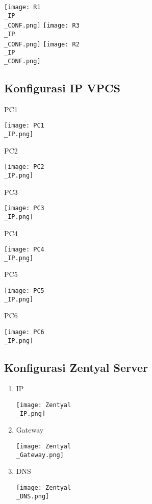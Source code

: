\documentclass[12pt, a4paper]{article}
\begin{document}
  \begin{center}
      \texttt{[image: R1\\\_IP\\\_CONF.png]}
      \texttt{[image: R3\\\_IP\\\_CONF.png]}
      \texttt{[image: R2\\\_IP\\\_CONF.png]}
  \end{center}

  \newpage

  \subsection*{Konfigurasi IP VPCS}

  \begin{enumerate}

      \begin{multicols}{2}

      \item PC1

        \texttt{[image: PC1\\\_IP.png]}

      \item PC2

        \texttt{[image: PC2\\\_IP.png]}

      \item PC3

        \texttt{[image: PC3\\\_IP.png]}

      \item PC4

        \texttt{[image: PC4\\\_IP.png]}

      \item PC5

        \texttt{[image: PC5\\\_IP.png]}

      \item PC6

        \texttt{[image: PC6\\\_IP.png]}

      \end{multicols}

  \end{enumerate}

  \subsection*{Konfigurasi Zentyal Server}

  \begin{enumerate}


      \item IP

        \texttt{[image: Zentyal\\\_IP.png]}

      \item Gateway

        \texttt{[image: Zentyal\\\_Gateway.png]}

      \item DNS

        \texttt{[image: Zentyal\\\_DNS.png]}

  \end{enumerate}
\end{document}
